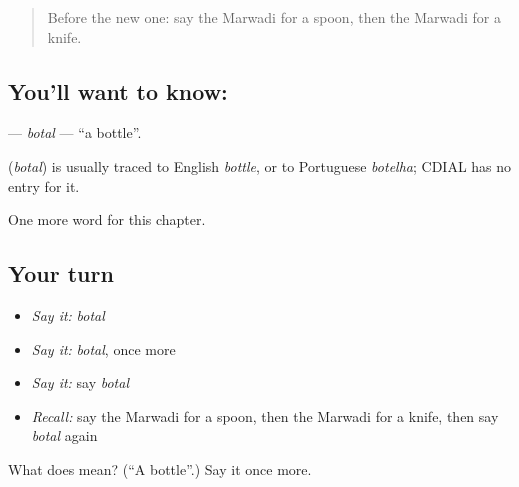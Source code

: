 \label{lesson:MW-C64-botal}



\begin{quote}
Before the new one: say the Marwadi for a spoon, then the Marwadi for a knife.
\end{quote}

\subsection*{You'll want to know: }
\textbf{} — \emph{botal} — \textquotedblleft{}a bottle\textquotedblright{}.

\begin{cousinweb}
\textbf{} (\emph{botal}) is usually traced to English \emph{bottle}, or to Portuguese \emph{botelha}; CDIAL has no entry for it.
\end{cousinweb}

\begin{grammarlens}[title={What you've built}]
One more word for this chapter.
\end{grammarlens}

\subsection*{Your turn}
\begin{itemize}
\raggedright
  \item \emph{Say it:} \emph{botal}
  \item \emph{Say it:} \emph{botal}, once more
  \item \emph{Say it:} say \emph{botal}
  \item \emph{Recall:} say the Marwadi for a spoon, then the Marwadi for a knife, then say \emph{botal} again
\end{itemize}

\begin{tcolorbox}[breakable,colback=teal!4,colframe=teal!35!black,title={Before you move on}]
What does  mean? (\textquotedblleft{}A bottle\textquotedblright{}.) Say it once more.
\end{tcolorbox}
